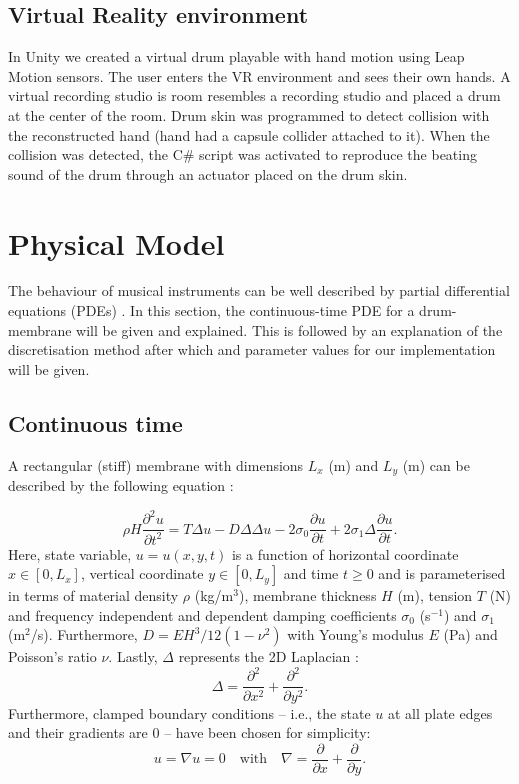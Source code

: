 \documentclass{vgtc}
\begin{document}
\subsection{Virtual Reality environment}
In Unity we created a virtual drum playable with hand motion using Leap Motion sensors. The user enters the VR environment and sees their own hands. A virtual recording studio is room  resembles a recording studio and placed a drum at the center of the room. Drum skin was programmed to detect collision with the reconstructed hand (hand had a capsule collider attached to it). When the collision was detected, the C\# script was activated to reproduce the beating sound of the drum through an actuator placed on the drum skin.

\section{Physical Model}\label{sec:PM}
The behaviour of musical instruments can be well described by partial differential equations (PDEs) \cite{Fletcher1998}. In this section, the continuous-time PDE for a drum-membrane will be given and explained. This is followed by an explanation of the discretisation method after which and parameter values for our implementation will be given. 

\subsection{Continuous time}
A rectangular (stiff) membrane with dimensions $L_x$ (m) and $L_y$ (m) can be described by the following equation \cite{bilbao2009numerical}:

\begin{equation}
\rho H\frac{\partial^2u}{\partial t^2} = T\Delta u - D\Delta\Delta u - 2 \sigma_0\frac{\partial u}{\partial t} + 2 \sigma_1 \Delta \frac{\partial u}{\partial t}.
\end{equation}
Here, state variable, $u = u(x,y,t)$ is a function of horizontal coordinate $x \in [0, L_x]$, vertical coordinate $y \in [0, L_y]$ and time $t\geq0$ and is parameterised in terms of material density $\rho$ (kg/m$^3$), membrane thickness $H$ (m), tension $T$ (N) and frequency independent and dependent damping coefficients $\sigma_0$ (s$^{-1}$) and $\sigma_1$ (m$^2$/s). Furthermore, $D = EH^3/12(1-\nu^2)$ with Young's modulus $E$ (Pa) and Poisson's ratio $\nu$. Lastly, $\Delta$ represents the 2D Laplacian \cite{bilbao2009numerical}:
\begin{equation}\label{eq:PDE}
    \Delta = \frac{\partial^2}{\partial x^2} + \frac{\partial^2}{\partial y^2}.
\end{equation}
Furthermore, clamped boundary conditions -- i.e., the state $u$ at all plate edges and their gradients are 0 -- have been chosen for simplicity:
\begin{equation}
    u = \nabla u = 0 \quad \text{with} \quad \nabla = \frac{\partial}{\partial x} + \frac{\partial}{\partial y}.
\end{equation}
\end{document}
